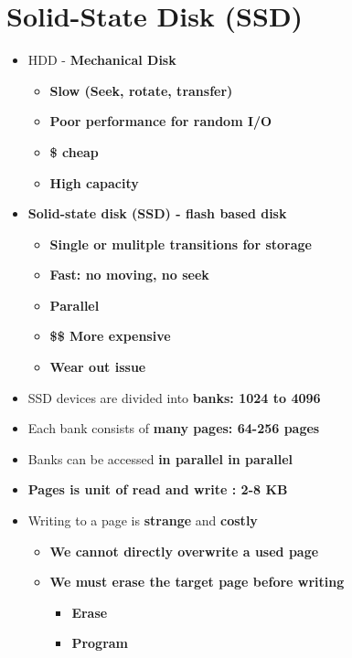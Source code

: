 \documentclass[a4paper,11pt,english]{article}
\begin{document}
\section*{Solid-State Disk (SSD)}
\begin{itemize}
    \item HDD - \textbf{\color{red} Mechanical Disk}
        \begin{itemize}
            \item \textbf{\color{red} Slow (Seek, rotate, transfer)}
            \item \textbf{\color{red} Poor performance for random I/O}
            \item \textbf{\color{blue} \$ cheap}
            \item \textbf{\color{blue} High capacity}
        \end{itemize}
    \item \textbf{\color{blue} Solid-state disk (SSD) - flash based disk}
        \begin{itemize}
            \item \textbf{\color{blue} Single or mulitple transitions for storage}
            \item \textbf{\color{blue} Fast: no moving, no seek}
            \item \textbf{\color{blue} Parallel}
            \item \textbf{\color{red} \$\$ More expensive}
            \item \textbf{\color{red} Wear out issue}
        \end{itemize}
    \item SSD devices are divided into \textbf{\color{blue} banks: 1024 to 4096}
    \item Each bank consists of \textbf{\color{blue} many pages: 64-256 pages}
    \item Banks can be accessed \textbf{\color{blue} in parallel \textbf{\color{blue} in parallel}}
    \item \textbf{\color{blue} Pages is unit of read and write : 2-8 KB}
    \item Writing to a page is \textbf{\color{red} strange} and \textbf{\color{red} costly}
        \begin{itemize}
            \item \textbf{\color{red} We cannot directly overwrite a used page}
            \item \textbf{\color{red} We must erase the target page before writing}
                \begin{itemize}
                    \item \textbf{\color{red} Erase}
                    \item \textbf{\color{red} Program}
                \end{itemize}
        \end{itemize}
\end{itemize}
\end{document}
